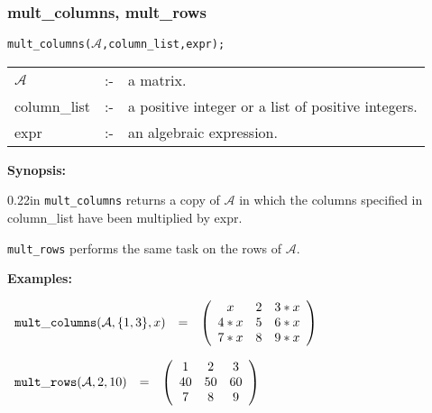 \subsubsection{mult\_columns, mult\_rows}
\label{linalg:mult_columns}

\hspace*{0.175in} {\tt mult\_columns($\mathcal{A}$,column\_list,expr);}

\hspace*{0.1in}  
\begin{tabular}{l l l}
$\mathcal{A}$   &:-& a matrix. \\
column\_list &:-& a positive integer or a list of positive integers. \\
expr        &:-& an algebraic expression.
\end{tabular}

{\bf Synopsis:} %

\begin{addtolength}{\leftskip}{0.22in}
{\tt mult\_columns} returns a copy of $\mathcal{A}$ in which
                the columns specified in column\_list have been 
multiplied by expr. 

{\tt mult\_rows} performs the same task on the rows of $\mathcal{A}$.

\end{addtolength}

{\bf Examples:}

\begin{flushleft}  
\hspace*{0.1in}
\begin{math}  
\begin{array}{ccc}
{\tt mult\_columns}(\mathcal{A},\{1,3\},x) & = & 
        \left( \begin{array}{ccc} x & 2 & 3*x \\ 4*x & 5 & 6*x \\ 7*x & 
8 & 9*x 
 \end{array} \right) 
\end{array}
\end{math}  
\end{flushleft}

\vspace*{0.1in}

\begin{flushleft}  
\hspace*{0.1in}
\begin{math}  
\begin{array}{ccc}
{\tt mult\_rows}(\mathcal{A},2,10) & = & 
        \left( \begin{array}{ccc} 1 & 2 & 3 \\ 40 & 50 & 60 \\ 7 & 8 & 
9 \end{array} \right) 
\end{array}
\end{math}  
\end{flushleft}

